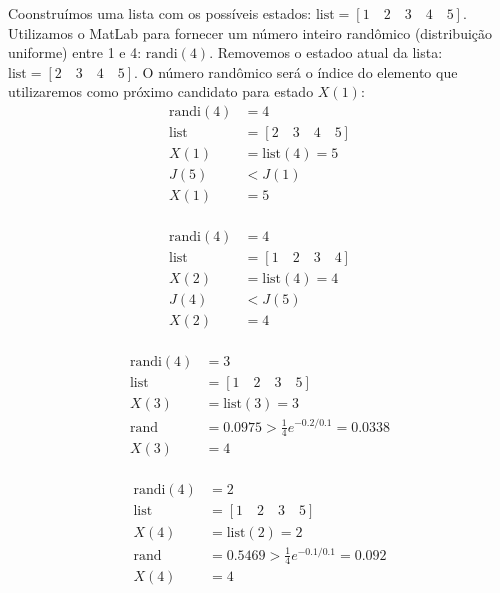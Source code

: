 \documentclass[12pt]{article}
\newenvironment{exercise}[2][Exercício]{\begin{trivlist}
\item[\hskip \labelsep {\bfseries #1}\hskip \labelsep {\bfseries #2.}]}{\end{trivlist}}
\begin{document}
\begin{exercise}{2.b}
Coonstruímos uma lista com os possíveis estados: $\text{list} = [1 \quad 2
\quad 3 \quad 4 \quad 5]$. Utilizamos o MatLab para fornecer um número inteiro
randômico (distribuição uniforme) entre 1 e 4:
$\text{randi}(4)$. Removemos o estadoo atual da lista: $\text{list} = [2
\quad 3 \quad 4 \quad 5]$. O número randômico será o índice do elemento que
utilizaremos como próximo candidato para estado $X(1)$: 
\begin{align}
\nonumber \text{randi}(4) &= 4 \\
\nonumber \text{list} &= [2
\quad 3 \quad 4 \quad 5] \\
\nonumber X(1) &= \text{list}(4) = 5 \\
\nonumber J(5) &< J(1) \\
\nonumber X(1) &= 5 \\
\end{align}

\begin{align}
\nonumber \text{randi}(4) &= 4 \\
\nonumber \text{list} &= [1
\quad 2 \quad 3 \quad 4] \\
\nonumber X(2) &= \text{list}(4) = 4 \\
\nonumber J(4) &< J(5) \\
\nonumber X(2) &= 4 \\
\end{align}

\begin{align}
\nonumber \text{randi}(4) &= 3 \\
\nonumber \text{list} &= [1
\quad 2 \quad 3 \quad 5] \\
\nonumber X(3) &= \text{list}(3) = 3 \\
\nonumber \text{rand} &= 0.0975 > \frac{1}{4}e^{-0.2/0.1} = 0.0338  \\
\nonumber X(3) &= 4 \\
\end{align}

\begin{align}
\nonumber \text{randi}(4) &= 2 \\
\nonumber \text{list} &= [1
\quad 2 \quad 3 \quad 5] \\
\nonumber X(4) &= \text{list}(2) = 2 \\
\nonumber \text{rand} &= 0.5469 > \frac{1}{4}e^{-0.1/0.1} = 0.092  \\
\nonumber X(4) &= 4 \\
\end{align}
\end{exercise}
\end{document}
